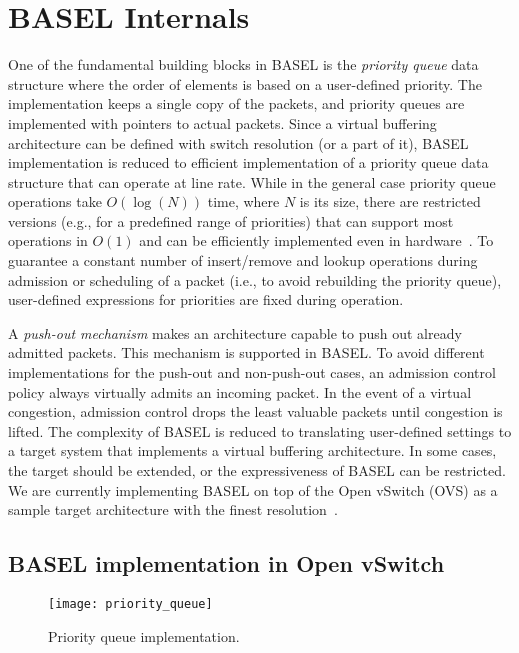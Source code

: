 \documentclass{article}
\newcommand{\barch}{BASEL}
\begin{document}
\section{\barch{} Internals}\label{sec:implementation}
One of the fundamental building blocks in \barch{} is the \emph{priority queue} data structure where the order of elements is based on a user-defined priority. The implementation keeps a single copy of the packets, and priority queues are implemented with pointers to actual packets. Since a virtual buffering architecture can be defined with switch resolution (or a part of it), \barch{} implementation is reduced to efficient implementation of a priority queue data structure that can operate at line rate. While in the general case priority queue operations take $O(\log(N))$ time, where $N$ is its size, there are restricted versions (e.g., for a predefined range of priorities) that can support most operations in $O(1)$ and can be efficiently implemented even in hardware~\cite{MortonLS07,IoannouK07}.
To guarantee a constant number of insert/remove and lookup operations during admission or scheduling of a packet (i.e., to avoid rebuilding the priority queue), user-defined expressions for priorities are fixed during operation.



A \emph{push-out mechanism} makes an architecture capable to push out already admitted packets. This mechanism is supported in \barch{}. To avoid different implementations for the push-out and non-push-out cases, an admission control policy always virtually admits an incoming packet. In the event of a virtual congestion, admission control drops the least valuable packets until congestion is lifted.
The complexity of \barch{} is reduced to translating user-defined settings to a target system that implements a virtual buffering architecture. In some cases, the target should be extended, or the expressiveness of \barch{} can be restricted. 
We are currently implementing \barch{} on top of the Open vSwitch (OVS) as a sample target
architecture with the finest resolution~\cite{ovs,PfaffPKJZRGWSSA15}. 




\subsection{\barch{} implementation in Open vSwitch}


\begin{figure}[t]
\centering
\hspace{-2mm}
\texttt{[image: priority\_queue]}
\vspace{-2.5\topsep}
\caption{Priority queue implementation.}
\vspace{-6pt}
\label{fig:priority_queue}
\end{figure}
\end{document}
